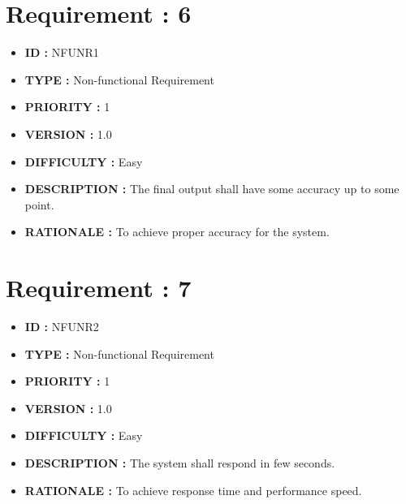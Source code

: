 \documentclass[a4paper, 11pt]{article}
\begin{document}
 
 \section*{Requirement : 6}
     \begin{itemize}[noitemsep]
      \item \textbf{ID  : } NFUNR1
      \item \textbf{TYPE  : } Non-functional Requirement
      \item \textbf{PRIORITY  : } 1
      \item \textbf{VERSION  : } 1.0
      \item\textbf{DIFFICULTY  :} Easy
      \item \textbf{DESCRIPTION  : } The final output shall have some accuracy up to some point.
      \item\textbf{RATIONALE  : } To achieve proper accuracy for the system.
    \end{itemize}

\section*{Requirement : 7}
     \begin{itemize}[noitemsep]
      \item \textbf{ID  : } NFUNR2
      \item \textbf{TYPE  : } Non-functional Requirement
      \item \textbf{PRIORITY  : } 1
      \item \textbf{VERSION  : } 1.0
      \item\textbf{DIFFICULTY  :} Easy
      \item \textbf{DESCRIPTION  : } The system shall respond in few seconds. 
      \item\textbf{RATIONALE  : } To achieve response time and performance speed.
    \end{itemize}  
\end{document}
